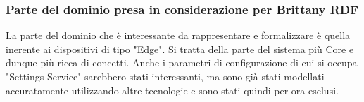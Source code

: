 
\subsubsection{Parte del dominio presa in considerazione per Brittany RDF}
\noindent La parte del dominio che è interessante da rappresentare e formalizzare è quella inerente ai dispositivi di tipo "Edge". Si tratta della parte del sistema più Core e dunque più ricca di concetti. \newline
Anche i parametri di configurazione di cui si occupa "Settings Service" sarebbero stati interessanti, ma sono già stati modellati accuratamente utilizzando altre tecnologie e sono stati quindi per ora esclusi.



